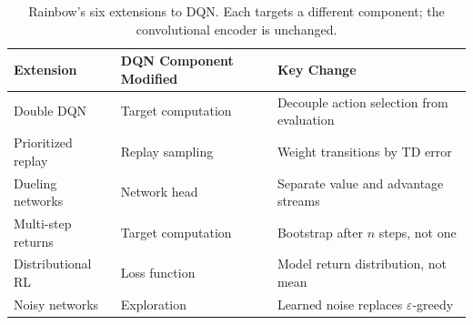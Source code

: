 \begin{table}[ht]
\centering
\renewcommand{\arraystretch}{1.4}
\begin{tabular}{lll}
\toprule
Extension & DQN Component Modified & Key Change \\
\midrule
Double DQN       & Target computation
    & Decouple action selection from evaluation \\
Prioritized replay & Replay sampling
    & Weight transitions by TD error \\
Dueling networks & Network head
    & Separate value and advantage streams \\
Multi-step returns & Target computation
    & Bootstrap after $n$ steps, not one \\
Distributional RL  & Loss function
    & Model return distribution, not mean \\
Noisy networks   & Exploration
    & Learned noise replaces $\varepsilon$-greedy \\
\bottomrule
\end{tabular}
\caption{Rainbow's six extensions to DQN. Each targets a different
  component; the convolutional encoder is unchanged.}
\label{tab:rainbow-extensions}
\end{table}

